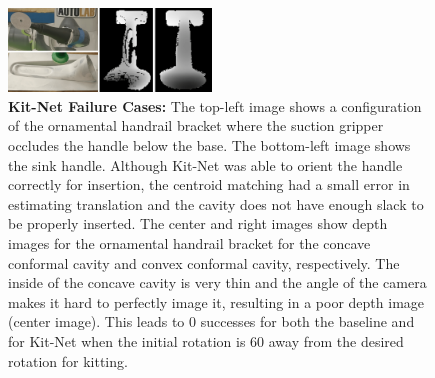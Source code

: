 \begin{figure}[t]
  \vspace{8pt}
  \centering
  \includegraphics[width=0.48\textwidth]{figures/Failure Cases.png}
  \caption{\textbf{Kit-Net Failure Cases: } The top-left image shows a configuration of the ornamental handrail bracket
  where the suction gripper occludes
  the handle below the base. The bottom-left image shows the sink handle. Although Kit-Net was able to orient the handle correctly for insertion, the centroid matching had a small error in estimating translation and the cavity does not have enough slack to be properly inserted. The center and right images show depth images for the ornamental handrail bracket for the concave conformal cavity and convex conformal cavity, respectively.
  The inside of the concave cavity is very thin and the angle of the camera makes it hard to perfectly image it, resulting in a poor depth image (center image). %
  This leads to 0 successes for both the baseline and for Kit-Net when the initial rotation is 60\degree{} away from the desired rotation for kitting.}
  \label{fig:failure-modes}
\end{figure}


